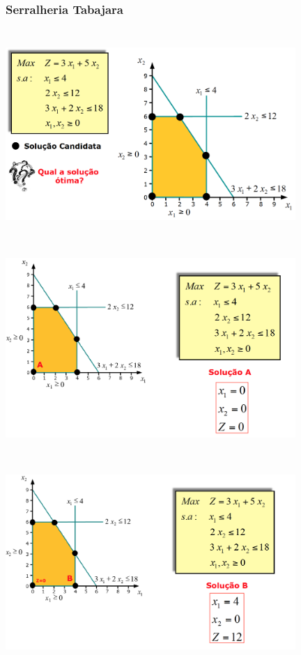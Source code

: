 \documentclass{beamer}
\begin{document}
\begin{frame}
	\frametitle{Serralheria Tabajara}
	{
		\includegraphics[width=11cm,height=8cm]{Tabajara_02.png}
	}
	\only<2>
	{
		\includegraphics[width=11cm,height=8cm]{Tabajara_03.png}
	}
	\only<3>
	{
		\includegraphics[width=11cm,height=8cm]{Tabajara_04.png}
	}
	\only<4>

\end{frame}
\end{document}
